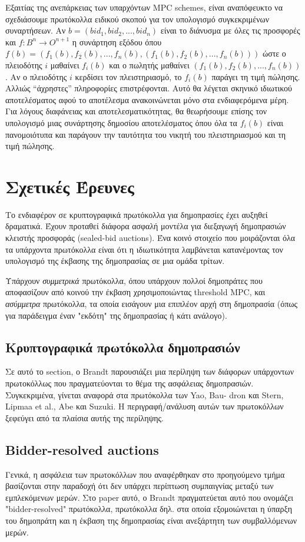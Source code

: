 \documentclass[a4paper,11pt]{article}
\begin{document}
Εξαιτίας της ανεπάρκειας των υπαρχόντων MPC schemes, είναι αναπόφευκτο να σχεδιάσουμε πρωτόκολλα ειδικού
σκοπού για τον υπολογισμό συγκεκριμένων συναρτήσεων. Αν $b = (bid_1, bid_2, ..., bid_n)$ είναι το διάνυσμα με
όλες τις προσφορές και $f: B^n \rightarrow O^{n+1}$ η συνάρτηση εξόδου όπου $f(b) = (f_1(b), f_2(b), ...,
f_n(b),(f_1(b), f_2(b), ...,f_n(b)))$ ώστε ο πλειοδότης $i$ μαθαίνει $f_i(b)$ και ο πωλητής μαθαίνει $(f_1(b),
f_2(b), ..., f_n(b))$. Αν ο πλειοδότης $i$ κερδίσει τον πλειστηριασμό, το $f_i(b)$ παράγει τη τιμή πώλησης.
Αλλιώς “άχρηστες” πληροφορίες επιστρέφονται. Αυτό θα λέγεται σκηνικό ιδιωτικού αποτελέσματος αφού το
αποτέλεσμα ανακοινώνεται μόνο στα ενδιαφερόμενα μέρη. Για λόγους διαφάνειας και αποτελεσματικότητας, θα
θεωρήσουμε επίσης τον υπολογισμό μιας συνάρτησης δημοσίου αποτελέσματος όπου όλα τα $f_i(b)$ είναι
πανομοιότυπα και παράγουν την ταυτότητα του νικητή του πλειστηριασμού και τη τιμή πώλησης.

\section{Σχετικές Έρευνες} Το ενδιαφέρον σε κρυπτογραφικά πρωτόκολλα για δημοπρασίες έχει αυξηθεί δραματικά.
Έχουν προταθεί διάφορα ασφαλή μοντέλα για διεξαγωγή δημοπρασιών κλειστής προσφοράς (sealed-bid auctions). Ένα
κοινό στοιχείο που μοιράζονται όλα τα υπάρχοντα πρωτόκολλα είναι ότι η ιδιωτικότητα λαμβάνεται κατανέμοντας
τον υπολογισμό της έκβασης της δημοπρασίας σε μια ομάδα τρίτων.

Υπάρχουν \emph{συμμετρικά} πρωτόκολλα, όπου υπάρχουν πολλοί δημοπράτες που αποφασίζουν από κοινού την έκβαση
χρησιμοποιώντας threshold MPC, και \emph{ασύμμετρα} πρωτόκολλα, τα οποία εισάγουν μια επιπλέον αρχή στη
δημοπρασία (όπως για παράδειγμα έναν "εκδότη" της δημοπρασίας ή κάτι ανάλογο).

	\subsection{Κρυπτογραφικά πρωτόκολλα δημοπρασιών}
	Σε αυτό το section, ο Brandt παρουσιάζει μια περίληψη των διάφορων υπάρχοντων πρωτοκόλλως που πραγματεύονται
	το θέμα της ασφάλειας δημοπρασιών. Συγκεκριμένα, γίνεται αναφορά στα πρωτόκολλα των Yao, Bau- dron και Stern,
	Lipmaa et al., Abe και Suzuki. Η περιγραφή/ανάλυση αυτών των πρωτοκόλλων ξεφεύγει από τα πλαίσια αυτής της περίληψης.
	
	\subsection{Bidder-resolved auctions}
	Γενικά, η ασφάλεια των πρωτοκόλλων που αναφέρθηκαν στο προηγούμενο τμήμα βασίζονται στην παραδοχή ότι δεν υπάρχει
	περίπτωση συμπαιγνίας μεταξύ των εμπλεκόμενων μερών. Στο paper αυτό, ο Brandt πραγματεύεται αυτό που ονομάζει 
	"bidder-resolved" πρωτόκολλα, πρωτόκολλα δηλ. στα οποία εξομοιώνεται η ύπαρξη του δημοπράτη και η έκβαση της δημοπρασίας
	είναι ανεξάρτητη των συμβαλλόμενων μερών.
	
\end{document}
